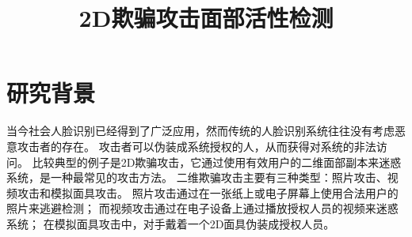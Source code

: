 \documentclass[conference]{IEEEtran}
\renewcommand{\abstractname}{{\hei 摘要}}
\begin{document}
%
\title{2D欺骗攻击面部活性检测}


\author{\IEEEauthorblockN{}
\and
{}
\and
\IEEEauthorblockN{}
}

\maketitle

\section{研究背景}
当今社会人脸识别已经得到了广泛应用，然而传统的人脸识别系统往往没有考虑恶意攻击者的存在。
攻击者可以伪装成系统授权的人，从而获得对系统的非法访问。
比较典型的例子是2D欺骗攻击，它通过使用有效用户的二维面部副本来迷惑系统，是一种最常见的攻击方法。
二维欺骗攻击主要有三种类型：照片攻击、视频攻击和模拟面具攻击。
照片攻击通过在一张纸上或电子屏幕上使用合法用户的照片来逃避检测；
而视频攻击通过在电子设备上通过播放授权人员的视频来迷惑系统；
在模拟面具攻击中，对手戴着一个2D面具伪装成授权人员。
\end{document}
